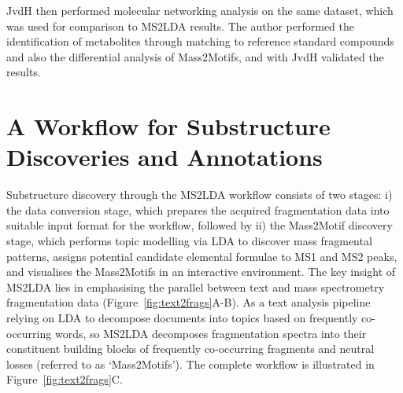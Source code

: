 JvdH then performed molecular networking analysis on the same dataset, which was used for comparison to MS2LDA results. The author performed the identification of metabolites through matching to reference standard compounds and also the differential analysis of Mass2Motifs, and with JvdH validated the results. 

\section{A Workflow for Substructure Discoveries and Annotations\label{sub:ms2lda-workflow}}

Substructure discovery through the MS2LDA workflow consists of two stages: i) the data conversion stage, which prepares the acquired fragmentation data into suitable input format for the workflow, followed by ii) the Mass2Motif discovery stage, which performs topic modelling via LDA to discover mass fragmental patterns, assigns potential candidate elemental formulae to MS1 and MS2 peaks, and visualises the Mass2Motifs in an interactive environment. The key insight of MS2LDA lies in emphasising the parallel between text and mass spectrometry fragmentation data (Figure~\ref{fig:text2frags}A-B). As a text analysis pipeline relying on LDA to decompose documents into topics based on frequently co-occurring words, so MS2LDA decomposes fragmentation spectra into their constituent building blocks of frequently co-occurring fragments and neutral losses (referred to as ‘Mass2Motifs’). The complete workflow is illustrated in Figure~\ref{fig:text2frags}C. 

